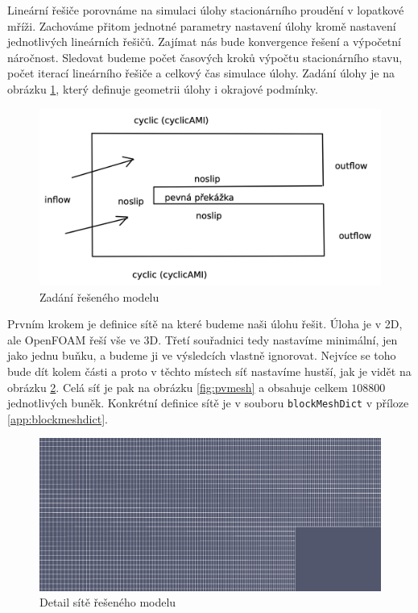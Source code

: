 \documentclass[a4paper,12pt]{report}
\theoremstyle{remark}
\begin{document}
	Lineární řešiče porovnáme na simulaci úlohy stacionárního proudění v lopatkové mříži. Zachováme přitom jednotné parametry nastavení úlohy kromě nastavení jednotlivých lineárních řešičů. Zajímat nás bude konvergence řešení a výpočetní náročnost. Sledovat budeme počet časových kroků výpočtu stacionárního stavu, počet iterací lineárního řešiče a celkový čas simulace úlohy. Zadání úlohy je na obrázku \ref{fig:zadani}, který definuje geometrii úlohy i okrajové podmínky. 
	\begin{figure}[H]
		\centering
		\includegraphics[width=1\linewidth]{zadani.png}
		\caption{Zadání řešeného modelu}
		\label{fig:zadani}
	\end{figure}
Prvním krokem je definice sítě na které budeme naši úlohu řešit. Úloha je v 2D, ale OpenFOAM řeší vše ve 3D. Třetí souřadnici tedy nastavíme minimální, jen jako jednu buňku, a budeme ji ve výsledcích vlastně ignorovat.  Nejvíce se toho bude dít kolem  části a proto v těchto místech síť nastavíme hustší, jak je vidět na obrázku \ref{fig:pvmesh-detail}. Celá síť je pak na obrázku \ref{fig:pvmesh} a obsahuje celkem $108800$ jednotlivých buněk. Konkrétní definice sítě je v souboru \texttt{blockMeshDict} v příloze \ref{app:blockmeshdict}.
\begin{figure}[H]
	\centering
	\includegraphics[width=1\linewidth]{pv-mesh-detail.png}
	\caption{Detail sítě řešeného modelu}
	\label{fig:pvmesh-detail}
\end{figure}
\end{document}
